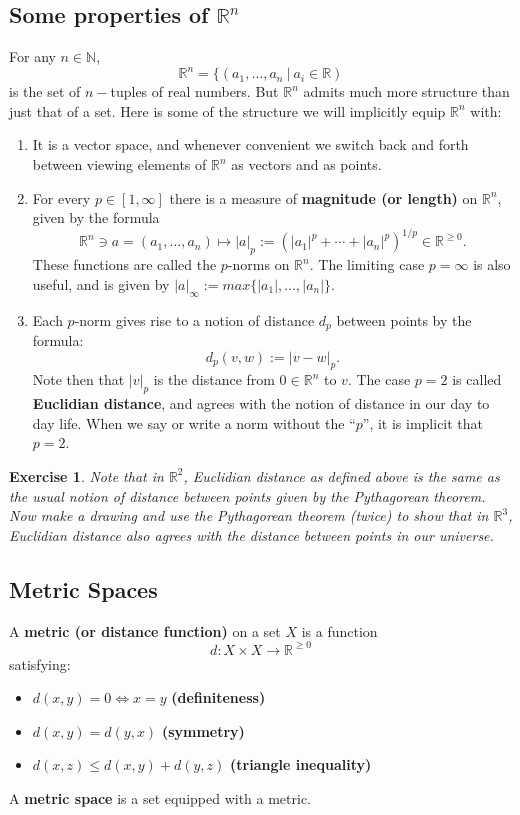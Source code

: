 \documentclass[12pt]{amsart}
\newtheorem{exercise}[theorem]{Exercise}
\numberwithin{equation}{section}
\newcommand\Rb{{\mathbb R}} %
\newcommand\Nb{{\mathbb N}} %
\newcommand{\To}{\longrightarrow}
\newcommand{\mTo}{\longmapsto}
\newcommand{\pipe}{\:|\:}
\begin{document}
\subsection{Some properties of $\Rb^n$} For any $n\in\Nb$, $$\Rb^n = \{(a_1,\dots,a_n\pipe a_i\in\Rb)$$ is the set of $n-$tuples of real numbers.  But $\Rb^n$ admits much more structure than just that of a set.  Here is some of the structure we will implicitly equip $\Rb^n$ with:
\begin{enumerate}
\item It is a vector space, and whenever convenient we switch back and forth between viewing elements of $\Rb^n$ as vectors and as points.
\item For every $p\in [1,\infty]$ there is a measure of \textbf{magnitude (or length)} on $\Rb^n$, given by the formula
$$ \Rb^n\ni a=(a_1,\dots,a_n)\mTo |a|_p:=(|a_1|^p+\cdots+|a_n|^p)^{1/p}\in \Rb^{\geq 0}.$$
These functions are called the $p$-norms on $\Rb^n$.  The limiting case $p=\infty$ is also useful, and is given by $|a|_\infty:=max\{|a_1|,\dots,|a_n|\}$.
\item Each $p$-norm gives rise to a notion of distance $d_p$ between points by the formula:
$$d_p(v,w):=|v-w|_p.$$
Note then that $|v|_p$ is the distance from $0\in\Rb^n$ to $v$.
The case $p=2$ is called \textbf{Euclidian distance}, and agrees with the notion of distance in our day to day life. When we say or write a norm without the ``$p$'', it is implicit that $p=2$.
\end{enumerate}

\begin{exercise} Note that in $\Rb^2$, Euclidian distance as defined above is the same as the usual notion of distance between points given by the Pythagorean theorem.  Now make a drawing and use the Pythagorean theorem (twice) to show that in $\Rb^3$, Euclidian distance also agrees with the distance between points in our universe.
\end{exercise}

\subsection{Metric Spaces} A \textbf{metric (or distance function)} on a set $X$ is a function
$$d:X\times X\To \Rb^{\geq0}$$ satisfying:
 \begin{itemize}
  \item $d(x,y)=0\iff x=y$ \textbf{(definiteness)}
  \item $d(x,y) = d(y,x)$ \textbf{(symmetry)}
  \item $d(x,z)\leq d(x,y)+d(y,z)$ \textbf{(triangle inequality)}
 \end{itemize}
A \textbf{metric space} is a set equipped with a metric.
\end{document}
